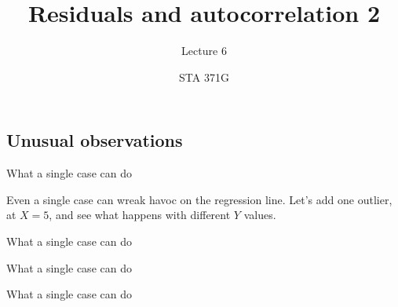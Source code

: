 \documentclass{beamer}\usepackage[]{graphicx}\usepackage[]{color}
\title{Residuals and autocorrelation 2}
\subtitle{Lecture 6}
\author{STA 371G}
\newenvironment{knitrout}{}{} %
\begin{document}
  
  

  \frame{\maketitle}



  \begin{darkframes}
    \section{Unusual observations}

    \begin{frame}{What a single case can do}
      \begin{center}
        Even a single case can wreak havoc on the regression line.
        Let's add one outlier, at $X=5$, and see what happens with different
        $Y$ values.
      \end{center}
    \end{frame}

    \begin{frame}{What a single case can do}
\begin{knitrout}


\end{knitrout}
    \end{frame}

    \begin{frame}{What a single case can do}
\begin{knitrout}


\end{knitrout}
    \end{frame}

    \begin{frame}{What a single case can do}
\begin{knitrout}


\end{knitrout}
    \end{frame}


\end{darkframes}
\end{document}
